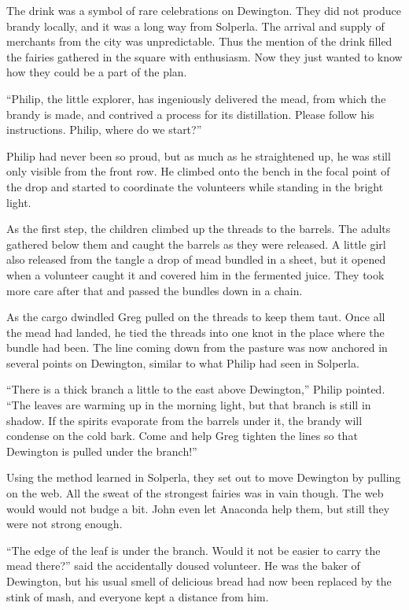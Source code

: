 \documentclass[10pt]{memoir}
\begin{document}
The drink was a symbol of rare celebrations on Dewington. They did not produce
brandy locally, and it was a long way from Solperla. The arrival and supply of
merchants from the city was unpredictable. Thus the mention of the drink filled
the fairies gathered in the square with enthusiasm. Now they just wanted to
know how they could be a part of the plan.

``Philip, the little explorer, has ingeniously delivered the mead, from which
the brandy is made, and contrived a process for its distillation. Please follow
his instructions. Philip, where do we start?''

Philip had never been so proud, but as much as he straightened up, he was still
only visible from the front row. He climbed onto the bench in the focal point
of the drop and started to coordinate the volunteers while standing in the
bright light.

As the first step, the children climbed up the threads to the barrels. The
adults gathered below them and caught the barrels as they were released. A
little girl also released from the tangle a drop of mead bundled in a sheet,
but it opened when a volunteer caught it and covered him in the fermented
juice. They took more care after that and passed the bundles down in a chain.

As the cargo dwindled Greg pulled on the threads to keep them taut. Once all
the mead had landed, he tied the threads into one knot in the place where the
bundle had been. The line coming down from the pasture was now anchored in
several points on Dewington, similar to what Philip had seen in Solperla.

``There is a thick branch a little to the east above Dewington,'' Philip
pointed. ``The leaves are warming up in the morning light, but that branch is
still in shadow. If the spirits evaporate from the barrels under it, the brandy
will condense on the cold bark. Come and help Greg tighten the lines so that
Dewington is pulled under the branch!''

Using the method learned in Solperla, they set out to move Dewington by pulling
on the web. All the sweat of the strongest fairies was in vain though. The
web would would not budge a bit. John even let Anaconda help them, but still
they were not strong enough.

``The edge of the leaf is under the branch. Would it not be easier to carry the
mead there?'' said the accidentally doused volunteer. He was the baker of
Dewington, but his usual smell of delicious bread had now been replaced by the
stink of mash, and everyone kept a distance from him.
\end{document}
